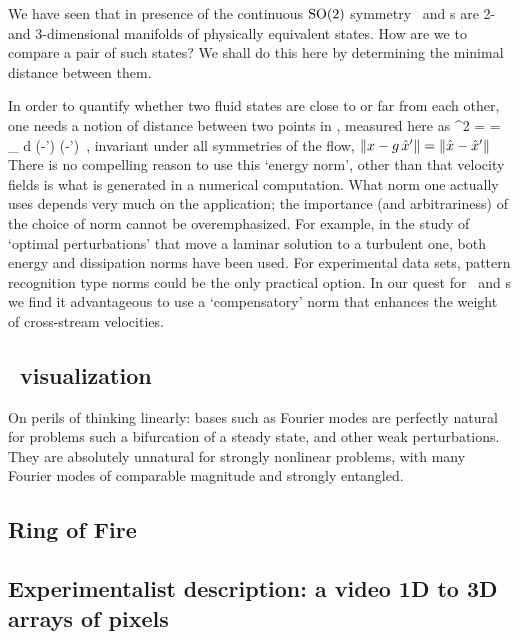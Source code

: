 We have seen that in presence of the continuous $\textrm{SO}(2)$ symmetry
\reqva\ and \rpo s are 2- and 3-dimensional manifolds of physically
equivalent states. How are we to compare a pair of such states? We shall
do this here by determining the minimal distance between them.

In order to quantify
whether two fluid states are close to or far from each other, one
needs a notion of distance between two points in \statesp, measured
here as
\beq
  ^2  =  =
\int_\bCell \! d \bx \;
(-') \cdot (-')
\,,
invariant under all symmetries of the flow,
$\|{x-g\,{\hat{x}'}}\|=\|{\hat{x}-{\hat{x}'}}\|$
There is no compelling reason to use this {`energy norm'}, other than
that velocity fields is what is generated in a numerical
computation. What norm one actually uses depends very much on the
application; the importance (and arbitrariness) of the choice of
norm cannot be overemphasized. For example, in the study of `optimal perturbations' that
move a laminar solution to a turbulent one, both energy
\citep{TeHaHe10} and dissipation \citep{LoCaCoPeGo11} norms have been
used.
For experimental data sets, pattern recognition type norms could be the
only practical option.
In our quest for \reqva\ and \rpo s we
find it advantageous to use a `compensatory' norm 
that enhances the weight of cross-stream velocities.


\subsection{\Statesp\ visualization}

On perils of thinking linearly: bases such as Fourier modes are
perfectly natural for problems such a bifurcation of a steady state, and
other weak perturbations. They are absolutely unnatural for strongly
nonlinear problems, with many Fourier modes of comparable magnitude and
strongly entangled.

\subsection{\CLe}
\subsection{Ring of Fire}
\subsection{Experimentalist description: a video 1D to 3D arrays of pixels}
